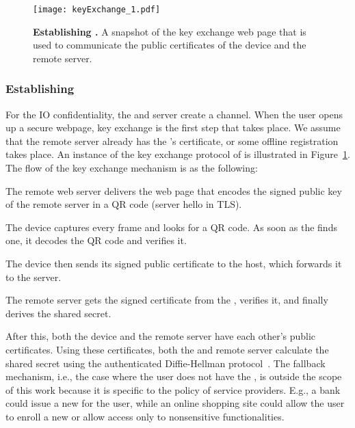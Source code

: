 \begin{figure}[t]
\centering
\texttt{[image: keyExchange\_1.pdf]}
\caption{\textbf{Establishing \tls.} A snapshot of the key exchange web page that is used to communicate the public certificates of the device and the remote server.}
\spacesave
\label{fig:keyExchange}
\centering
\end{figure} 

\subsubsection{\bfseries Establishing \tls}
\label{sec:prototype:impl:tls}

For the IO confidentiality, the \device and server create a \tls channel. When the user opens up a secure webpage, key exchange is the first step that takes place. We assume that the remote server already has the \device's certificate, or some offline registration takes place. An instance of the key exchange protocol of \name is illustrated in Figure~\ref{fig:keyExchange}. The flow of the key exchange mechanism is as the following:

\begin{mylist}
  \item[\one] The remote web server delivers the web page that encodes the signed public key of the remote server in a QR code (server hello in TLS). 
  \item[\two] The device captures every frame and looks for a QR code. As soon as the \device finds one, it decodes the QR code and verifies it. 
  \item[\three] The device then sends its signed public certificate to the host, which forwards it to the server.
  \item[\four] The remote server gets the signed certificate from the \device, verifies it, and finally derives the shared secret.
 
\end{mylist}

After this, both the device and the remote server have each other's public certificates. Using these certificates, both the \device and remote server calculate the shared secret using the authenticated Diffie-Hellman protocol~\cite{blake1998authenticated}.
The fallback mechanism, i.e., the case where the user does not have the \device, is outside the scope of this work because it is specific to the policy of service providers. E.g., a bank could issue a new \device for the user, while an online shopping site could allow the user to enroll a new \device or allow access only to nonsensitive functionalities. 


